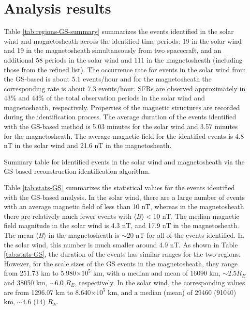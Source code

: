 \section{Analysis results}
Table \ref{tab:regions-GS-summary} summarizes the events identified in the solar wind and magnetosheath across the identified time periods: 19 in the solar wind and 19 in the magnetosheath simultaneously from two spacecraft, and an additional 58 periods in the solar wind and 111 in the magnetosheath (including those from the refined \cite{ToyEdens:2024} list). The occurrence rate for events in the solar wind from the GS-based is about 5.1 events/hour and for the magnetosheath the corresponding rate is about 7.3 events/hour. SFRs are observed approximately in 43\% and 44\% of the total observation periods in the solar wind and magnetosheath, respectively. Properties of the magnetic structures are recorded during the identification process. The average duration of the events identified with the GS-based method is 5.03 minutes for the solar wind and 3.57 minutes for the magnetosheath. The average magnetic field for the identified events is 4.8 nT in the solar wind and 21.6 nT in the magnetosheath.

\begin{table}
    \centering
    \caption{Summary table for identified events in the solar wind and magnetosheath via the GS-based reconstruction identification algorithm.}
    
    \label{tab:regions-GS-summary}
\end{table}

Table \ref{tab:stats-GS} summarizes the statistical values for the events identified with the GS-based analysis. In the solar wind, there are a large number of events with an average magnetic field of less than 10 nT, whereas in the magnetosheath there are relatively much fewer events with $\langle B\rangle < 10$ nT. The median magnetic field magnitude in the solar wind is 4.3 nT, and 17.9 nT in the magnetosheath. The mean $\langle B\rangle$ in the magnetosheath is $\sim$20 nT for all of the events identified. In the solar wind, this number is much smaller around 4.9 nT. As shown in Table \ref{tab:stats-GS}, the duration of the events has similar ranges for the two regions. However, for the scale sizes of the GS events in the magnetosheath, they range from 251.73 km to 5.980$\times 10^5$ km, with a median and mean of 16090 km, $\sim$2.5$R_E$ and 38050 km, $\sim$6.0 $R_E$, respectively. In the solar wind, the corresponding values are from 1296.07 km to 8.640$\times 10^5$ km, and a median (mean) of 29460 (91040) km, $\sim$4.6 (14) $R_E$.

